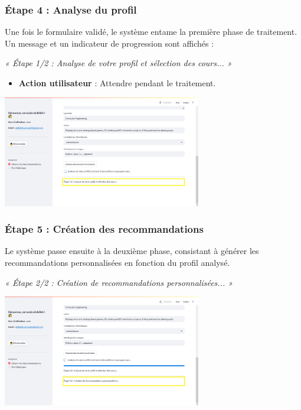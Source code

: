 \vspace{0.3cm}

\subsubsection*{Étape 4 : Analyse du profil}

Une fois le formulaire validé, le système entame la première phase de traitement. Un message et un indicateur de progression sont affichés :

\begin{center}
\textit{« Étape 1/2 : Analyse de votre profil et sélection des cours... »}
\end{center}

\begin{itemize}
  \item \textbf{Action utilisateur} : Attendre pendant le traitement.
\end{itemize}

\begin{center}
\includegraphics[width=0.65\textwidth]{images/analyse de donner cv.png}
\end{center}

\vspace{0.3cm}

\subsubsection*{Étape 5 : Création des recommandations}

Le système passe ensuite à la deuxième phase, consistant à générer les recommandations personnalisées en fonction du profil analysé.

\begin{center}
\textit{« Étape 2/2 : Création de recommandations personnalisées... »}
\end{center}

\begin{center}
\includegraphics[width=0.65\textwidth]{images/creation des recommodation.png}
\end{center}

